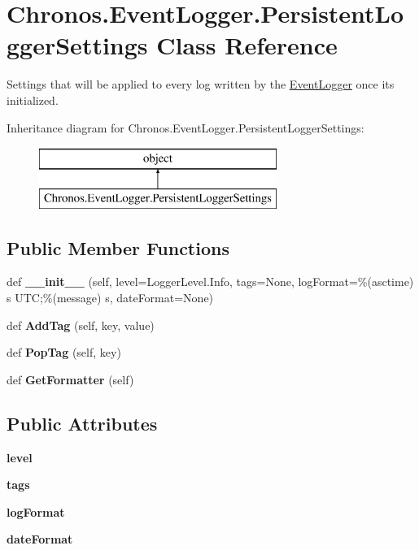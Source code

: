 \hypertarget{classChronos_1_1EventLogger_1_1PersistentLoggerSettings}{}\section{Chronos.\+Event\+Logger.\+Persistent\+Logger\+Settings Class Reference}
\label{classChronos_1_1EventLogger_1_1PersistentLoggerSettings}


Settings that will be applied to every log written by the \hyperlink{classChronos_1_1EventLogger_1_1EventLogger}{Event\+Logger} once it\textquotesingle{}s initialized.  


Inheritance diagram for Chronos.\+Event\+Logger.\+Persistent\+Logger\+Settings\+:\begin{figure}[H]
\begin{center}
\leavevmode
\includegraphics[height=2.000000cm]{classChronos_1_1EventLogger_1_1PersistentLoggerSettings}
\end{center}
\end{figure}
\subsection*{Public Member Functions}
\begin{DoxyCompactItemize}
\item 
def {\bfseries \+\_\+\+\_\+init\+\_\+\+\_\+} (self, level=Logger\+Level.\+Info, tags=None, log\+Format=\textquotesingle{}\%(asctime) s U\+TC;\%(message) s\textquotesingle{}, date\+Format=None)
\item 
def {\bfseries Add\+Tag} (self, key, value)
\item 
def {\bfseries Pop\+Tag} (self, key)
\item 
def {\bfseries Get\+Formatter} (self)
\end{DoxyCompactItemize}
\subsection*{Public Attributes}
\begin{DoxyCompactItemize}
\item 
{\bfseries level}
\item 
{\bfseries tags}
\item 
{\bfseries log\+Format}
\item 
{\bfseries date\+Format}
\end{DoxyCompactItemize}


